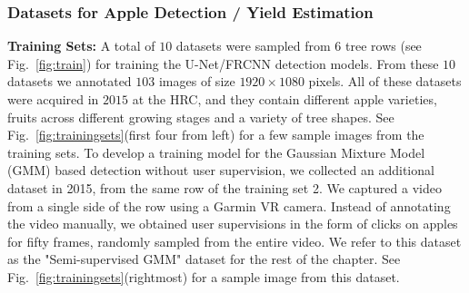 \subsubsection{Datasets for Apple Detection / Yield Estimation}
\textbf{Training Sets:} A total of $10$ datasets were sampled from $6$ tree rows (see Fig.~\ref{fig:train}) for training the U-Net/FRCNN detection models. From these $10$ datasets we annotated $103$ images of size $1920 \times 1080$ pixels. All of these datasets were acquired in $2015$ at the HRC, and they contain different apple varieties, fruits across different growing stages and a variety of tree shapes. See Fig.~\ref{fig:trainingsets}(first four from left) for a few sample images from the training sets.
To develop a training model for the Gaussian Mixture Model (GMM) based detection without user supervision, we collected an additional dataset in 2015, from the same row of the training set 2. We captured a video from a single side of the row using a Garmin VR camera. Instead of annotating the video manually, we obtained user supervisions in the form of clicks on apples for fifty frames, randomly sampled from the entire video. We refer to this dataset as the "Semi-supervised GMM" dataset for the rest of the chapter. See Fig.~\ref{fig:trainingsets}(rightmost) for a sample image from this dataset.

